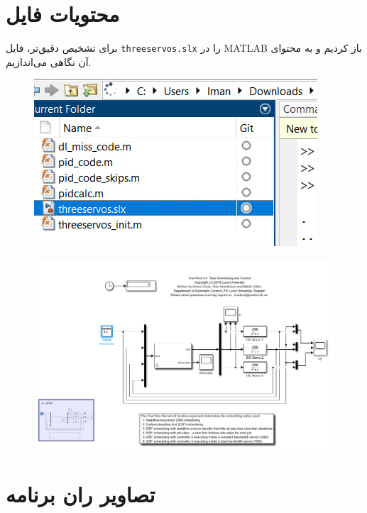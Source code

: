 \newpage

\section*{محتویات فایل }

برای تشخیص دقیق‌تر، فایل \texttt{threeservos.slx} را در MATLAB باز کردیم و به محتوای آن نگاهی می‌اندازیم.

\begin{figure}[H]
	\centering
	\includegraphics{4.jpg}
	\label{fig:label4}
\end{figure}

\begin{figure}[H]
	\centering
	\includegraphics{17.jpg}
	\label{fig:label4}
\end{figure}

\newpage

\section*{تصاویر ران برنامه}

